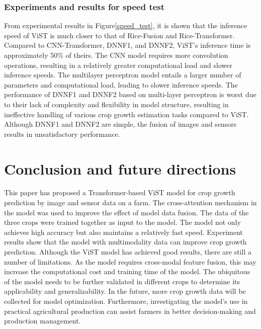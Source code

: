 \documentclass[acmsmall, screen]{acmart}
\begin{document}
\subsubsection{Experiments and results for speed test}



 From experimental results in Figure\ref{speed_test}, it is shown that the inference speed of ViST is much closer to that of Rice-Fusion and Rice-Transformer. Compared to CNN-Transformer, DNNF1, and DNNF2, ViST's inference time is approximately 50\% of theirs. The CNN model requires more convolution operations, resulting in a relatively greater computational load and slower inference speeds. The multilayer perceptron model entails a larger number of parameters and computational load, leading to slower inference speeds. The performance of DNNF1 and DNNF2 based on multi-layer perceptron is worst due to their lack of complexity and flexibility in model structure, resulting in ineffective handling of various crop growth estimation tasks compared to ViST. Although DNNF1 and DNNF2 are simple, the fusion of images and sensors results in unsatisfactory performance.

\section{Conclusion and future directions}

This paper has proposed a Transformer-based ViST model for crop growth prediction by image and sensor data on a farm. The cross-attention mechanism in the model was used to improve the effect of model data fusion. The data of the three crops were trained together as input to the model. The model not only achieves high accuracy but also maintains a relatively fast speed. Experiment results show that the model with multimodality data can improve crop growth prediction. Although the ViST model has achieved good results, there are still a number of limitations. As the model requires cross-modal feature fusion, this may increase the computational cost and training time of the model. The ubiquitous of the model needs to be further validated in different crops to determine its applicability and generalizability. In the future, more crop growth data will be collected for model optimization. Furthermore, investigating the model's use in practical agricultural production can assist farmers in better decision-making and production management.
\end{document}
